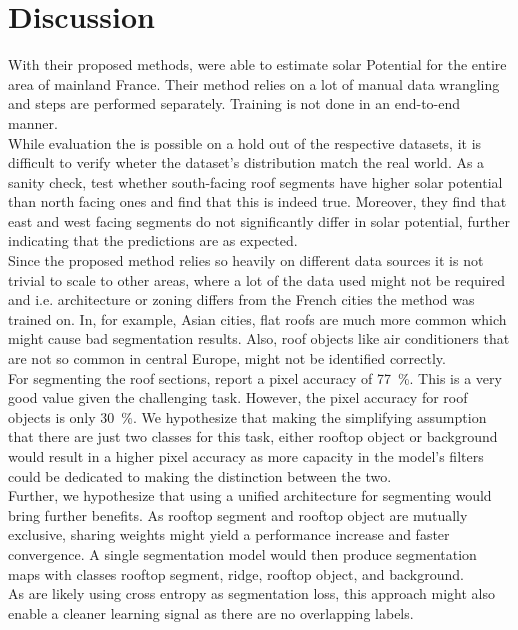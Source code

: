 \documentclass{article} %
\begin{document}
\section*{Discussion}
With their proposed methods, \citet{de2021predicting} were able to estimate solar Potential for the entire area of mainland France. Their method relies on a lot of manual data wrangling and steps are performed separately. Training is not done in an end-to-end manner.\\
While evaluation the is possible on a hold out of the respective datasets, it is difficult to verify wheter the dataset's distribution match the real world. As a sanity check, \citet{de2021predicting} test whether south-facing roof segments have higher solar potential than north facing ones and find that this is indeed true. Moreover, they find that east and west facing segments do not significantly differ in solar potential, further indicating that the predictions are as expected.\\
Since the proposed method relies so heavily on different data sources it is not trivial to scale to other areas, where a lot of the data used might not be required and i.e. architecture or zoning differs from the French cities the method was trained on. In, for example, Asian cities, flat roofs are much more common which might cause bad segmentation results. Also, roof objects like air conditioners that are not so common in central Europe, might not be identified correctly.\\
For segmenting the roof sections, \citet{de2021predicting} report a pixel accuracy of \SI{77}{\percent}. This is a very good value given the challenging task. However, the pixel accuracy for roof objects is only \SI{30}{\percent}. We hypothesize that making the simplifying assumption that there are just two classes for this task, either rooftop object or background would result in a higher pixel accuracy as more capacity in the model's filters could be dedicated to making the distinction between the two.\\
Further, we hypothesize that using a unified architecture for segmenting would bring further benefits. As rooftop segment and rooftop object are mutually exclusive, sharing weights might yield a performance increase and faster convergence. A single segmentation model would then produce segmentation maps with classes rooftop segment, ridge, rooftop object, and background.\\
As \citet{de2021predicting} are likely using cross entropy as segmentation loss, this approach might also enable a cleaner learning signal as there are no overlapping labels.\\
\end{document}
